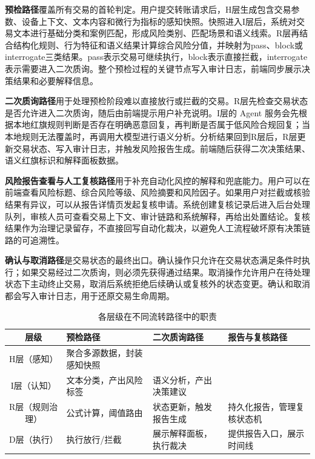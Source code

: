\documentclass{xduugthesis}
\begin{document}
\textbf{预检路径}覆盖所有交易的首轮判定。用户提交转账请求后，H层生成包含交易参数、设备上下文、文本内容和微行为指标的感知快照。快照进入I层后，系统对交易文本进行基础分类和案例匹配，形成风险类别、匹配场景和语义线索。R层再结合结构化规则、行为特征和语义结果计算综合风险分值，并映射为pass、block或interrogate三类结果。pass表示交易可继续执行，block表示直接拦截，interrogate表示需要进入二次质询。整个预检过程的关键节点写入审计日志，前端同步展示决策结果和必要解释信息。

\textbf{二次质询路径}用于处理预检阶段难以直接放行或拦截的交易。R层先检查交易状态是否允许进入二次质询，随后由前端提示用户补充说明。I层的 Agent 服务会先根据本地红旗规则判断是否存在明确恶意回复，再判断是否属于低风险合规回复；当本地规则无法覆盖时，再调用大模型进行语义分析。分析结果回到R层后，R层更新交易状态、写入审计日志，并触发风险报告生成。前端随后获得二次决策结果、语义红旗标识和解释面板数据。

\textbf{风险报告查看与人工复核路径}用于补充自动化风控的解释和兜底能力。用户可以在前端查看风险标题、综合风险等级、风险摘要和风险因子。如果用户对拦截或核验结果有异议，可以从报告详情页发起复核申请。系统创建复核记录后进入后台处理队列，审核人员可查看交易上下文、审计链路和系统解释，再给出处置结论。复核结果作为治理记录留存，不直接回写自动化裁决，以避免人工流程破坏原有决策链路的可追溯性。

\textbf{确认与取消路径}是交易状态的最终出口。确认操作只允许在交易状态满足条件时执行；如果交易经过二次质询，则必须先获得通过结果。取消操作允许用户在待处理状态下主动终止交易，取消后系统拒绝后续确认或复核外的状态变更。确认和取消都会写入审计日志，用于还原交易生命周期。

\begin{table}[H]
    \centering
    \caption{各层级在不同流转路径中的职责}
    \label{tab:layer-responsibility}
    \begin{tabular}{|c|p{3cm}|p{3cm}|p{3cm}|}
        \hline
        层级 & 预检路径 & 二次质询路径 & 报告与复核路径 \\
        \hline
        H层（感知） & 聚合多源数据，封装感知快照 &  &  \\
        \hline
        I层（认知） & 文本分类，产出风险标签 & 语义分析，产出决策建议 &  \\
        \hline
        R层（规则治理） & 公式计算，阈值路由 & 状态更新，触发报告生成 & 持久化报告，管理复核状态机 \\
        \hline
        D层（执行） & 执行放行/拦截 & 展示解释面板，执行裁决 & 提供报告入口，展示时间线 \\
        \hline
    \end{tabular}
\end{table}
\end{document}

